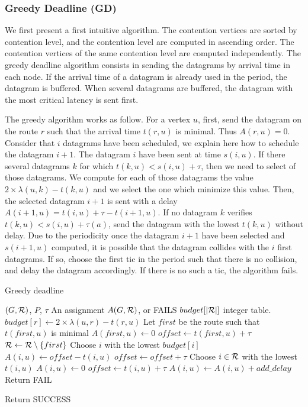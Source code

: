 \documentclass[english]{article}
\begin{document}
\subsubsection{Greedy Deadline (GD)}
We first present a first intuitive algorithm.
The contention vertices are sorted by contention level, and the contention level are computed in ascending order. The contention vertices of the same contention level are computed independently. The greedy deadline algorithm consists in sending the datagrams by arrival time in each node. If the arrival time of a datagram is already used in the period, the datagram is buffered. When several datagrams are buffered, the datagram with the most critical latency is sent first.

The greedy algorithm works as follow. For a vertex $u$, first, send the datagram on the route $r$ such that the arrival time $t(r,u)$ is minimal. Thus $A(r,u) = 0$.
Consider that $i$ datagrams have been scheduled, we explain here how to schedule the datagram $i+1$. The datagram $i$ have been sent at time $s(i,u)$. If there several datagrams $k$ for which $t(k,u) < s(i,u) + \tau $, then we need to select of those datagrams. We compute for each of those datagrams the value $2\times \lambda(u,k) - t(k,u)$ and we select the one which minimize this value. Then, the selected datagram $i+1$ is sent with a delay $A(i+1,u) = t(i,u)+\tau - t(i+1,u)$. If no datagram $k$ verifies $t(k,u) < s(i,u) + \tau (a)$, send the datagram with the lowest $t(k,u)$ without delay.
Due to the periodicity once the datagram $i+1$ have been selected and $s(i+1,u)$ computed, it is possible that the datagram collides with the $i$ first datagrams. If so, choose the first tic in the period such that there is no collision, and delay the datagram accordingly. If there is no such a tic, the algorithm fails.
\begin{algorithm}[H]
	\caption{Greedy deadline}
	\begin{algorithmic}
	\REQUIRE $(G,{\cal R})$, $P$, $\tau$
	\ENSURE An assignment $A(G,{\cal R})$, or FAILS
	\STATE $budget[|{\cal R}|]$ integer table.
      \STATE  $budget[r] \leftarrow 2\times \lambda(u,r) - t(r,u)$
	\ENDFOR
	\STATE Let $first$ be the route such that $t(first,u)$ is minimal
	\STATE $A(first,u) \leftarrow 0$
	\STATE $offset \leftarrow t(first,u)+\tau$
	\STATE ${\cal R} \leftarrow {\cal R}\setminus \{first\}$
    \STATE Choose $i$ with the lowest $budget[i]$
    \STATE $A(i,u) \leftarrow offset - t(i,u)$
    \STATE $offset \leftarrow offset + \tau$
    \ELSE
     \STATE Choose $i \in {\cal R}$ with the lowest $t(i,u)$
     \STATE $A(i,u) \leftarrow 0$
     \STATE $offset \leftarrow t(i,u) + \tau$
    \ENDIF
    \STATE $A(i,u) \leftarrow A(i,u) + add\_delay$
    \ELSE
   \STATE Return FAIL
    \ENDIF
    \ENDIF
    
    \ENDWHILE
    \STATE Return SUCCESS
	\end{algorithmic}
	\end{algorithm}
\end{document}

